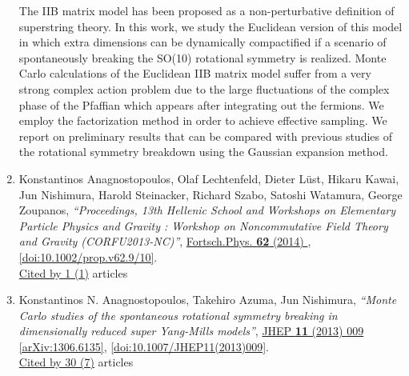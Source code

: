 \documentclass[a4paper,10pt]{article}
\begin{document}
\begin{enumerate}
The IIB matrix model has been proposed as a non-perturbative definition of superstring theory. In this work, we study the Euclidean version of this model in which extra dimensions can be dynamically compactified if a scenario of spontaneously breaking the SO(10) rotational symmetry is realized. Monte Carlo calculations of the Euclidean IIB matrix model suffer from a very strong complex action problem due to the large fluctuations of the complex phase of the Pfaffian which appears after integrating out the fermions. We employ the factorization method in order to achieve effective sampling. We report on preliminary results that can be compared with previous studies of the rotational symmetry breakdown using the Gaussian expansion method.
\item Konstantinos Anagnostopoulos, Olaf Lechtenfeld, Dieter Lüst, Hikaru Kawai, Jun Nishimura, Harold Steinacker, Richard Szabo, Satoshi Watamura, George Zoupanos, {\it ``Proceedings, 13th Hellenic School and Workshops on Elementary Particle Physics and Gravity : Workshop on Noncommutative Field Theory and Gravity (CORFU2013-NC)''}, \href{https://www.doi.org/10.1002/prop.v62.9/10}{Fortsch.Phys. {\bf 62} (2014) }, \href{https://www.doi.org/10.1002/prop.v62.9/10}{[doi:10.1002/prop.v62.9/10]}.
\\\href{https://inspirehep.net/literature/?q=refersto%3Arecid%3A1323135}{Cited by 1 (1)} articles


\item Konstantinos N. Anagnostopoulos, Takehiro Azuma, Jun Nishimura, {\it ``Monte Carlo studies of the spontaneous rotational symmetry breaking in dimensionally reduced super Yang-Mills models''}, \href{https://www.doi.org/10.1007/JHEP11(2013)009}{JHEP {\bf 11} (2013) 009} \href{https://arxiv.org/abs/1306.6135}{[arXiv:1306.6135]}, \href{https://www.doi.org/10.1007/JHEP11(2013)009}{[doi:10.1007/JHEP11(2013)009]}.
\\\href{https://inspirehep.net/literature/?q=refersto%3Arecid%3A1239963}{Cited by 30 (7)} articles


\end{enumerate}
\end{document}
